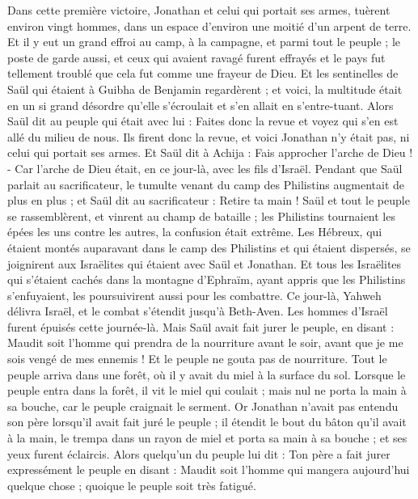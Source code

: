 \begin{multicols}{2}
Dans cette première victoire, Jonathan et celui qui portait ses armes, tuèrent environ vingt hommes, dans un espace d'environ une moitié d'un arpent de terre.
Et il y eut un grand effroi au camp, à la campagne, et parmi tout le peuple ; le poste de garde aussi, et ceux qui avaient ravagé furent effrayés et le pays fut tellement troublé que cela fut comme une frayeur de Dieu.
Et les sentinelles de Saül qui étaient à Guibha de Benjamin regardèrent ; et voici, la multitude était en un si grand désordre qu'elle s'écroulait et s'en allait en s'entre-tuant.
Alors Saül dit au peuple qui était avec lui : Faites donc la revue et voyez qui s'en est allé du milieu de nous. Ils firent donc la revue, et voici Jonathan n'y était pas, ni celui qui portait ses armes.
Et Saül dit à Achija : Fais approcher l'arche de Dieu ! - Car l'arche de Dieu était, en ce jour-là, avec les fils d'Israël.
Pendant que Saül parlait au sacrificateur, le tumulte venant du camp des Philistins augmentait de plus en plus ; et Saül dit au sacrificateur : Retire ta main !
Saül et tout le peuple se rassemblèrent, et vinrent au champ de bataille ; les Philistins tournaient les épées les uns contre les autres, la confusion était extrême.
Les Hébreux, qui étaient montés auparavant dans le camp des Philistins et qui étaient dispersés, se joignirent aux Israëlites qui étaient avec Saül et Jonathan.
Et tous les Israëlites qui s'étaient cachés dans la montagne d'Ephraïm, ayant appris que les Philistins s'enfuyaient, les poursuivirent aussi pour les combattre.
Ce jour-là, Yahweh délivra Israël, et le combat s'étendit jusqu'à Beth-Aven.
Les hommes d'Israël furent épuisés cette journée-là. Mais Saül avait fait jurer le peuple, en disant : Maudit soit l'homme qui prendra de la nourriture avant le soir, avant que je me sois vengé de mes ennemis ! Et le peuple ne gouta pas de nourriture.
Tout le peuple arriva dans une forêt, où il y avait du miel à la surface du sol.
Lorsque le peuple entra dans la forêt, il vit le miel qui coulait ; mais nul ne porta la main à sa bouche, car le peuple craignait le serment.
Or Jonathan n'avait pas entendu son père lorsqu'il avait fait juré le peuple ; il étendit le bout du bâton qu'il avait à la main, le trempa dans un rayon de miel et porta sa main à sa bouche ; et ses yeux furent éclaircis.
Alors quelqu'un du peuple lui dit : Ton père a fait jurer expressément le peuple en disant : Maudit soit l'homme qui mangera aujourd'hui quelque chose ; quoique le peuple soit très fatigué.

\end{multicols}
